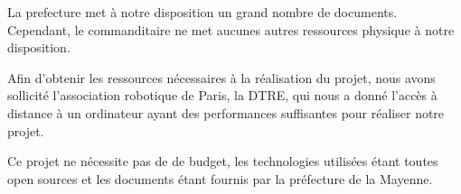 
La prefecture met à notre disposition un grand nombre de documents.
Cependant, le commanditaire ne met aucunes autres ressources physique à notre disposition.


Afin d'obtenir les ressources nécessaires à la réalisation du projet, nous avons sollicité l'association robotique de Paris, la DTRE, qui nous a donné l'accès à distance à un ordinateur ayant des performances suffisantes pour réaliser notre projet.


Ce projet ne nécessite pas de de budget, les technologies utilisées étant toutes open sources et les documents étant fournis par la préfecture de la Mayenne.
